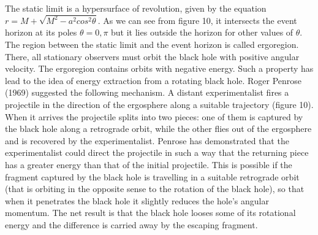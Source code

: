 \documentclass[12pt]{article}
\begin{document}
The static limit is a hypersurface of revolution,
given by the equation $r = M + \sqrt{M^2 - a^2 cos^2\theta}$. As we
can see from figure 10, it intersects the event horizon at
its poles $\theta = 0,\pi$ but it lies outside the horizon for other values
of $\theta$. The region between the static limit and the event horizon is
called ergoregion. There, all stationary observers must orbit the black hole
with positive angular velocity. The ergoregion contains orbits with negative
energy. Such a property has lead to the idea of energy extraction from a
rotating black hole.  Roger Penrose (1969) suggested the following mechanism.
A distant experimentalist
fires a projectile in the direction of the ergosphere along
a suitable trajectory (figure 10). When it arrives the projectile splits into two
pieces: one of them is captured by the black hole along a retrograde orbit,
while the other flies out of the ergosphere and is recovered by the
experimentalist.
Penrose has demonstrated that the experimentalist could direct the
projectile in such a way that the returning piece has a greater energy than
that of the initial projectile. This is possible if the fragment captured by the
black hole is travelling in a suitable retrograde orbit (that is orbiting in
the opposite sense to the rotation of the black hole), so that when it
penetrates the black hole it slightly reduces the hole's angular momentum. The
net result is that the black hole looses some of its rotational energy and the
difference is carried away by the escaping fragment. 
\end{document}
